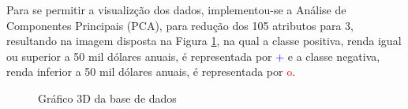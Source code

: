 Para se permitir a visualizção dos dados, implementou-se a Análise de Componentes Principais (PCA), para redução dos 105 atributos para 3, resultando na imagem disposta na Figura \ref{fig:dados3d}, na qual a classe positiva, renda igual ou superior a 50 mil dólares anuais, é representada por \textcolor{blue}{+} e a classe negativa, renda inferior a 50 mil dólares anuais, é representada por \textcolor{red}{o}.

\begin{figure}[h]
\centering
{}
\caption{Gráfico 3D da base de dados}
\label{fig:dados3d}
\end{figure}